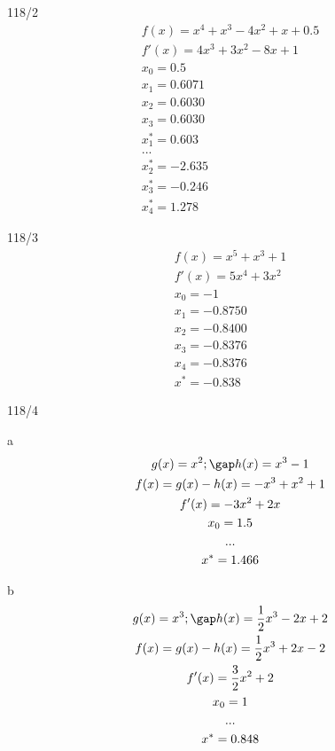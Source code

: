 \begin{exercise}{118/2}
\begin{gather*}
    f(x) = x^4 + x^3 - 4x^2 + x + 0.5 \\
    f'(x) = 4x^3 + 3x^2 - 8x + 1 \\
    x_0 = 0.5 \\
    x_1 = 0.6071 \\
    x_2 = 0.6030 \\
    x_3 = 0.6030 \\
    x_1^\ast = 0.603 \\
    ... \\
    x_2^\ast = -2.635 \\
    x_3^\ast = -0.246 \\
    x_4^\ast = 1.278
  \end{gather*}
\end{exercise}
\begin{exercise}{118/3}
  \begin{gather*}
    f(x) = x^5 + x^3 + 1 \\
    f'(x) = 5x^4 + 3x^2 \\
    x_0 = -1 \\
    x_1 = -0.8750 \\
    x_2 = -0.8400 \\
    x_3 = -0.8376 \\
    x_4 = -0.8376 \\
    x^\ast = -0.838
  \end{gather*}
\end{exercise}
\begin{exercise}{118/4}
  \item [a]
  \begin{gather*}
    g(x) = x^2; \gap h(x) = x^3 - 1 \\
    f(x) = g(x) - h(x) = -x^3 + x^2 + 1 \\
    f'(x) = -3x^2 + 2x \\
    x_0 = 1.5 \\
    ... \\
    x^\ast = 1.466
  \end{gather*}
  \item [b]
  \begin{gather*}
    g(x) = x^3; \gap h(x) = \frac{1}{2}x^3 - 2x + 2 \\
    f(x) = g(x) - h(x) = \frac{1}{2}x^3 + 2x - 2 \\
    f'(x) = \frac{3}{2}x^2 + 2 \\
    x_0 = 1 \\
    ... \\
    x^\ast = 0.848
  \end{gather*}
\end{exercise}
